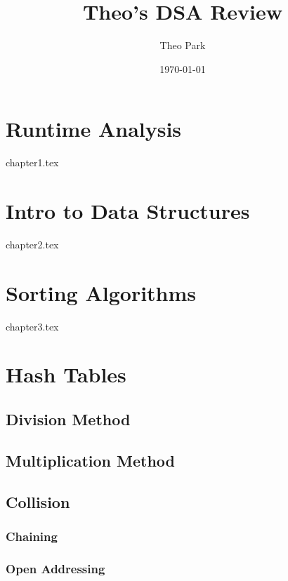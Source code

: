 \documentclass{report}
\title{Theo's DSA Review}
\author{Theo Park}
\date{\today}
\begin{document}
\maketitle

\pagestyle{fancy}


\tableofcontents


\chapter{Runtime Analysis}
{chapter1.tex}


\chapter{Intro to Data Structures}
{chapter2.tex}


\chapter{Sorting Algorithms}
{chapter3.tex}


\chapter{Hash Tables}

\section{Division Method}

\section{Multiplication Method}

\section{Collision}

\subsection{Chaining}

\subsection{Open Addressing}
\end{document}
